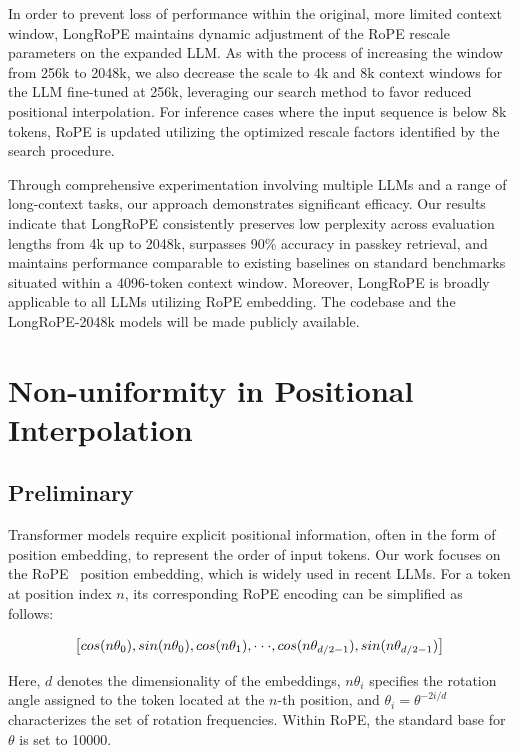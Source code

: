In order to prevent loss of performance within the original, more limited context window, {LongRoPE} maintains dynamic adjustment of the RoPE rescale parameters on the expanded LLM. As with the process of increasing the window from 256k to 2048k, we also decrease the scale to 4k and 8k context windows for the LLM fine-tuned at 256k, leveraging our search method to favor reduced positional interpolation. For inference cases where the input sequence is below 8k tokens, RoPE is updated utilizing the optimized rescale factors identified by the search procedure.

Through comprehensive experimentation involving multiple LLMs and a range of long-context tasks, our approach demonstrates significant efficacy. Our results indicate that LongRoPE consistently preserves low perplexity across evaluation lengths from 4k up to 2048k, surpasses 90\% accuracy in passkey retrieval, and maintains performance comparable to existing baselines on standard benchmarks situated within a 4096-token context window. Moreover, LongRoPE is broadly applicable to all LLMs utilizing RoPE embedding. The codebase and the LongRoPE-2048k models will be made publicly available.

\section{Non-uniformity in Positional Interpolation}
\label{sec:analysis}

\subsection{Preliminary}

Transformer models require explicit positional information, often in the form of position embedding, to represent the order of input tokens. Our work focuses on the RoPE~\cite{rope} position embedding, which is widely used in recent  LLMs. For a token at position index $n$, its corresponding RoPE encoding can be simplified as follows:

\begin{equation}
		\fontsize{7.8}{7.8} \selectfont
	\label{eq:rope}
	\left[ cos(n\theta_0), sin(n\theta_0), cos(n\theta_1), \cdot\cdot\cdot, cos(n\theta_{d/2-1}), sin(n\theta_{d/2-1}) \right]   
\end{equation}

Here, $d$ denotes the dimensionality of the embeddings,
$n\theta_i$ specifies the rotation angle assigned to the token located at the $n$-th position,
and $\theta_i=\theta^{-2i/d}$ characterizes the set of rotation frequencies. Within RoPE, the standard base for $\theta$ is set to 10000.

